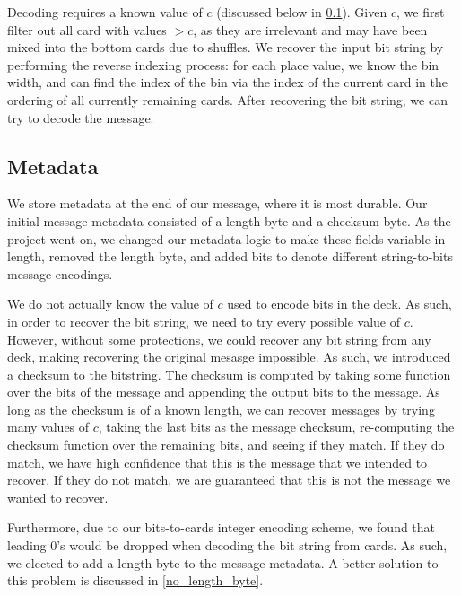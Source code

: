 \documentclass[titlepage]{article}
\begin{document}
Decoding requires a known value of $c$ (discussed below in \cref{metadata}). Given $c$, we first filter out all card with values $> c$, as they are irrelevant and may have been mixed into the bottom cards due to shuffles. We recover the input bit string by performing the reverse indexing process: for each place value, we know the bin width, and can find the index of the bin via the index of the current card in the ordering of all currently remaining cards. After recovering the bit string, we can try to decode the message.

\subsection{Metadata} \label{metadata}
We store metadata at the end of our message, where it is most durable. Our initial message metadata consisted of a length byte and a checksum byte. As the project went on, we changed our metadata logic to make these fields variable in length, removed the length byte, and added bits to denote different string-to-bits message encodings.

We do not actually know the value of $c$ used to encode bits in the deck. As such, in order to recover the bit string, we need to try every possible value of $c$. However, without some protections, we could recover any bit string from any deck, making recovering the original mesasge impossible. As such, we introduced a checksum to the bitstring. The checksum is computed by taking some function over the bits of the message and appending the output bits to the message. As long as the checksum is of a known length, we can recover messages by trying many values of $c$, taking the last bits as the message checksum, re-computing the checksum function over the remaining bits, and seeing if they match. If they do match, we have high confidence that this is the message that we intended to recover. If they do not match, we are guaranteed that this is not the message we wanted to recover.

Furthermore, due to our bits-to-cards integer encoding scheme, we found that leading 0's would be dropped when decoding the bit string from cards. As such, we elected to add a length byte to the message metadata. A better solution to this problem is discussed in \cref{no_length_byte}.
\end{document}
